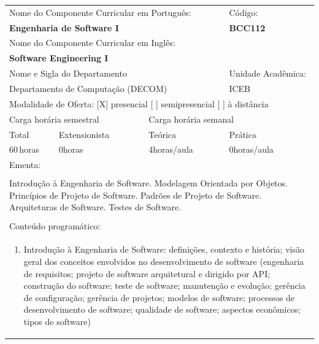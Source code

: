 \documentclass[11pt]{article}
\begin{document}
\begin{center}
\begin{longtable}{|p{4cm}|p{4cm}|p{4cm}|p{4cm}|}
\hline
\multicolumn{3}{|p{12cm}|}{Nome do Componente Curricular em Português:} &
\multicolumn{1}{p{4cm}|}{Código:} \\ 
\multicolumn{3}{|p{12cm}|}{\textbf{Engenharia de Software I}} &
\textbf{BCC112}\\ 
\multicolumn{3}{|p{12cm}|}{Nome do Componente Curricular em Inglês:} & \\ 
\multicolumn{3}{|p{12cm}|}{\textbf{Software Engineering I}} & \\ 
\hline
\multicolumn{3}{|p{12cm}|}{Nome e Sigla do Departamento} & Unidade Acadêmica: \\ 
\multicolumn{3}{|p{12cm}|}{Departamento de Computação (DECOM)} & {ICEB} \\ 
\hline
\multicolumn{4}{|p{16cm}|}{Modalidade de Oferta:
[X] presencial \hspace{0.6cm}
[ ] semipresencial \hspace{0.6cm}
[ ] à distância}\\
\hline
\multicolumn{2}{|p{8cm}|}{Carga horária semestral} &
\multicolumn{2}{p{8cm}|}{Carga horária semanal}\\
\hline
\multicolumn{1}{|p{4cm}|}{Total} &
\multicolumn{1}{p{4cm}|}{Extensionista} &
\multicolumn{1}{p{4cm}|}{Teórica} &
\multicolumn{1}{p{4cm}|}{Prática} \\ 
\multicolumn{1}{|p{4cm}|}{60\,horas} &
\multicolumn{1}{p{4cm}|}{0\;horas} &
\multicolumn{1}{p{4cm}|}{4\;horas/aula} &
\multicolumn{1}{p{4cm}|}{0\;horas/aula} \\ 
\hline
\multicolumn{4}{|p{16cm}|}{Ementa:}\\
\multicolumn{4}{|p{16cm}|}{}\\
\multicolumn{4}{|p{\dimexpr 16cm + 6\tabcolsep\relax}|}{Introdução à Engenharia de Software. Modelagem Orientada por Objetos. Princípios de Projeto de Software. Padrões de Projeto de Software. Arquiteturas de Software. Testes de Software.}\\
\multicolumn{4}{|p{16cm}|}{}\\
\hline
\multicolumn{4}{|p{16cm}|}{Conteúdo programático:}\\*
\multicolumn{4}{|p{\dimexpr 16cm + 6\tabcolsep\relax}|}{\begin{enumerate}[start=1]\item Introdução à Engenharia de Software: definições, contexto e história; visão geral dos conceitos envolvidos no desenvolvimento de software (engenharia de requisitos; projeto de software arquitetural e dirigido por API; construção do software; teste de software; manutenção e evolução; gerência de configuração; gerência de projetos; modelos de software; processos de desenvolvimento de software; qualidade de software; aspectos econômicos; tipos de software)\end{enumerate}}\\

\end{longtable}
\end{center}
\end{document}
